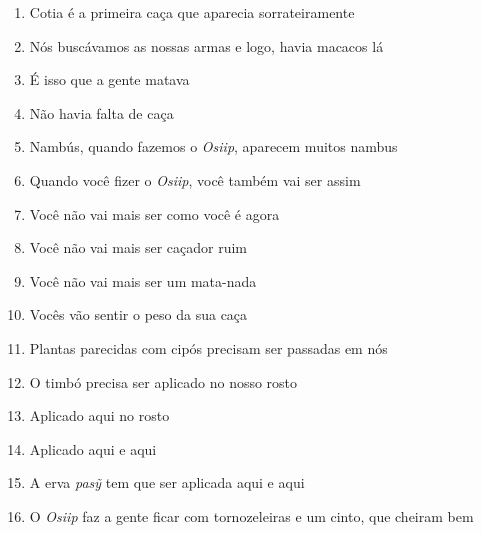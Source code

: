 \begin{enumerate}
 \item Cotia é a primeira caça que aparecia sorrateiramente

 \item Nós buscávamos as nossas armas e logo, havia macacos lá

 \item É isso que a gente matava

 \item Não havia falta de caça

 \item Nambús, quando fazemos o \textit{Osiip}, aparecem muitos nambus

 \begin{center}\end{center}

 \item Quando você fizer o \textit{Osiip}, você também vai ser assim

 \item Você não vai mais ser como você é agora

 \item Você não vai mais ser caçador ruim

 \item Você não vai mais ser um mata-nada

 \item Vocês vão sentir o peso da sua caça

 \begin{center}\end{center}

 \item Plantas parecidas com cipós precisam ser passadas em nós

 \item O timbó precisa ser aplicado no nosso rosto

 \item Aplicado aqui no rosto

 \item Aplicado aqui e aqui

 \item A erva \textit{pasỹ} tem que ser aplicada aqui e aqui

 \begin{center}\end{center}

 \item O \textit{Osiip} faz a gente ficar com tornozeleiras e um cinto, que
 cheiram bem


\end{enumerate}
